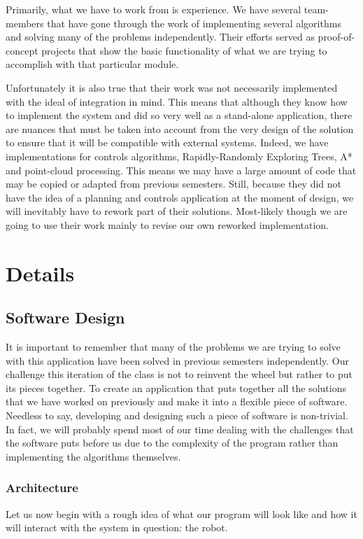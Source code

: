 \documentclass[titlepage]{article}
\begin{document}
Primarily, what we have to work from is experience. We have several team-members that have gone through the work of implementing several algorithms and solving many of the problems independently. Their efforts served as proof-of-concept projects that show the basic functionality of what we are trying to accomplish with that particular module.

Unfortunately it is also true that their work was not necessarily implemented with the ideal of integration in mind. This means that although they know how to implement the system and did so very well as a stand-alone application, there are nuances that must be taken into account from the very design of the solution to ensure that it will be compatible with external systems. Indeed, we have implementations for controls algorithms, Rapidly-Randomly Exploring Trees, A* and point-cloud processing. This means we may have a large amount of code that may be copied or adapted from previous semesters. Still, because they did not have the idea of a planning and controls application at the moment of design, we will inevitably have to rework part of their solutions. Most-likely though we are going to use their work mainly to revise our own reworked implementation.
\section{Details}
\subsection{Software Design}
It is important to remember that many of the problems we are trying to solve with this application have been solved in previous semesters independently. Our challenge this iteration of the class is not to reinvent the wheel but rather to put its pieces together. To create an application that puts together all the solutions that we have worked on previously and make it into a flexible piece of software. 
Needless to say, developing and designing such a piece of software is non-trivial. In fact, we will probably spend most of our time dealing with the challenges that the software puts before us due to the complexity of the program rather than implementing the algorithms themselves. 
\subsubsection{Architecture}
Let us now begin with a rough idea of what our program will look like and how it will interact with the system in question: the robot.
\end{document}
